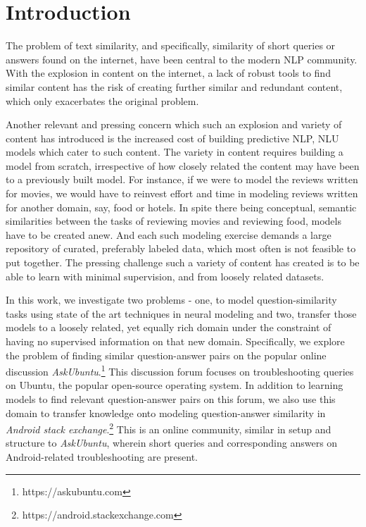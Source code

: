 \documentclass{sigkddExp}
\begin{document}
\section{Introduction}
The problem of text similarity, and specifically, similarity of short queries or answers found on the internet, have been central to the modern NLP community. With the explosion in content on the internet, a lack of robust tools to find similar content has the risk of creating further similar and redundant content, which only exacerbates the original problem.

Another relevant and pressing concern which such an explosion and variety of content has introduced is the increased cost of building predictive NLP, NLU models which cater to such content. The variety in content requires building a model from scratch, irrespective of how closely related the content may have been to a previously built model. For instance, if we were to model the reviews written for movies, we would have to reinvest effort and time in modeling reviews written for another domain, say, food or hotels. In spite there being conceptual, semantic similarities between the tasks of reviewing movies and reviewing food, models have to be created anew. And each such modeling exercise demands a large repository of curated, preferably labeled data, which most often is not feasible to put together. The pressing challenge such a variety of content has created is to be able to learn with minimal supervision, and from loosely related datasets.

In this work, we investigate two problems - one, to model question-similarity tasks using state of the art techniques in neural modeling and two, transfer those models to a loosely related, yet equally rich domain under the constraint of having no supervised information on that new domain. Specifically, we explore the problem of finding similar question-answer pairs on the popular online discussion \textit{AskUbuntu}.\footnote{https://askubuntu.com} This discussion forum focuses on troubleshooting queries on Ubuntu, the popular open-source operating system. In addition to  learning models to find relevant question-answer pairs on this forum, we also use this domain to transfer knowledge onto modeling question-answer similarity in \textit{Android stack exchange}.\footnote{https://android.stackexchange.com} This is an online community, similar in setup and structure to \textit{AskUbuntu}, wherein short queries and corresponding answers on Android-related troubleshooting are present.
\end{document}
